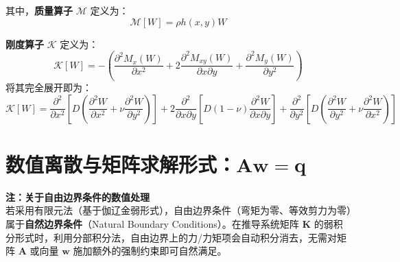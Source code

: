 \documentclass[a4paper,12pt]{ctexart}
\begin{document}
其中，\textbf{质量算子} $\mathcal{M}$ 定义为：
\begin{equation}
    \mathcal{M}[W] = \rho h(x,y) W
\end{equation}

\textbf{刚度算子} $\mathcal{K}$ 定义为：
\begin{equation}
    \mathcal{K}[W] = -\left( \frac{\partial^2 M_x(W)}{\partial x^2} + 2\frac{\partial^2 M_{xy}(W)}{\partial x \partial y} + \frac{\partial^2 M_y(W)}{\partial y^2} \right)
\end{equation}
将其完全展开即为：
\begin{equation}
    \mathcal{K}[W] = \frac{\partial^2}{\partial x^2} \left[ D \left( \frac{\partial^2 W}{\partial x^2} + \nu \frac{\partial^2 W}{\partial y^2} \right) \right] + 2 \frac{\partial^2}{\partial x \partial y} \left[ D (1-\nu) \frac{\partial^2 W}{\partial x \partial y} \right] + \frac{\partial^2}{\partial y^2} \left[ D \left( \frac{\partial^2 W}{\partial y^2} + \nu \frac{\partial^2 W}{\partial x^2} \right) \right]
\end{equation}

\section{数值离散与矩阵求解形式：$\mathbf{A}\mathbf{w} = \mathbf{q}$}

\vspace{1em}
\noindent \textbf{注：关于自由边界条件的数值处理}\\
若采用有限元法（基于伽辽金弱形式），自由边界条件（弯矩为零、等效剪力为零）属于\textbf{自然边界条件}（Natural Boundary Conditions）。在推导系统矩阵 $\mathbf{K}$ 的弱积分形式时，利用分部积分法，自由边界上的力/力矩项会自动积分消去，无需对矩阵 $\mathbf{A}$ 或向量 $\mathbf{w}$ 施加额外的强制约束即可自然满足。
\end{document}
